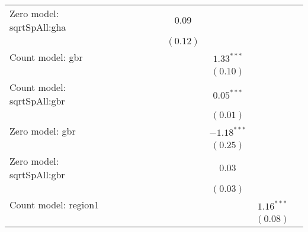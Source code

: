\begin{table}
\begin{center}
{\begin{tabular}{l c c c c c c c c c}
Zero model: sqrtSpAll:gha      &                &                &                &                 &                & $0.09$          &                 &                 &                \\
                               &                &                &                &                 &                & $(0.12)$        &                 &                 &                \\
Count model: gbr               &                &                &                &                 &                &                 & $1.33^{***}$    &                 &                \\
                               &                &                &                &                 &                &                 & $(0.10)$        &                 &                \\
Count model: sqrtSpAll:gbr     &                &                &                &                 &                &                 & $0.05^{***}$    &                 &                \\
                               &                &                &                &                 &                &                 & $(0.01)$        &                 &                \\
Zero model: gbr                &                &                &                &                 &                &                 & $-1.18^{***}$   &                 &                \\
                               &                &                &                &                 &                &                 & $(0.25)$        &                 &                \\
Zero model: sqrtSpAll:gbr      &                &                &                &                 &                &                 & $0.03$          &                 &                \\
                               &                &                &                &                 &                &                 & $(0.03)$        &                 &                \\
Count model: region1           &                &                &                &                 &                &                 &                 & $1.16^{***}$    &                \\
                               &                &                &                &                 &                &                 &                 & $(0.08)$        &                \\

\end{tabular}}
\end{center}
\end{table}
